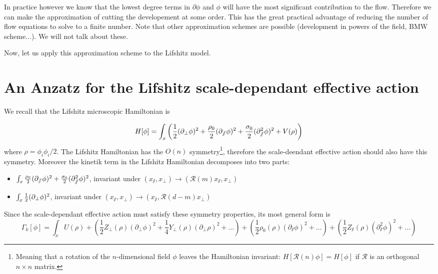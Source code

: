 In practice however we know that the lowest degree terms in $\partial \phi$ and $\phi$ will have the most significant contribution to the flow. Therefore we can make the approximation of cutting the developement at some order. This has the great practical advantage of reducing the number of flow equations to solve to a finite number. Note that other approximation schemes are possible (development in powers of the field, BMW scheme...). We will not talk about these.

Now, let us apply this approximation scheme to the Lifshitz model.

\section{An Anzatz for the Lifshitz scale-dependant effective action}
We recall that the Lifshitz microscopic Hamiltonian is

\begin{equation}
H[\phi] = \int_x \left( \frac{1}{2}(\partial_{\perp} \phi)^2 + \frac{\rho_0}{2}(\partial_{\sslash} \phi)^2 + \frac{\sigma_0}{2} (\partial_{\sslash}^2 \phi)^2 + V(\rho) \right)
\end{equation}
where $\rho = \phi_i \phi_i/2$. 
The Lifshitz Hamiltonian has the $O(n)$ symmetry\footnote{Meaning that a rotation of the $n$-dimensional field $\phi$ leaves the Hamiltonian invariant: $H[\mathcal{R}(n)\phi] = H[\phi]$ if $\mathcal{R}$ is an orthogonal $n \times n$ matrix.}, therefore the scale-deendant effective action should also have this symmetry. Moreover the kinetik term in the Lifshitz Hamiltonian decomposes into two parts:
\begin{itemize}
\item $\int_{x} \frac{\rho_0}{2}(\partial_{\sslash} \phi)^2 + \frac{\sigma_0}{2} (\partial_{\sslash}^2 \phi)^2$, invariant under $\left(x_\sslash,x_\perp \right) \rightarrow \left(\mathcal{R}(m) x_\sslash, x_\perp\right)$
\item $\int_{x} \frac{1}{2}(\partial_{\perp} \phi)^2$, invariant under $\left(x_\sslash,x_\perp \right) \rightarrow \left(x_\sslash, \mathcal{R}(d-m) x_\perp\right)$
\end{itemize}
Since the scale-dependant effective action must satisfy these symmetry properties, its most general form is
\begin{equation}
\Gamma_k[\phi] = \int_{x} U(\rho) + \left( \frac{1}{2} Z_\perp(\rho) (\partial_\perp \phi)^2 + \frac{1}{4} Y_\perp(\rho) (\partial_\perp \rho)^2 + ... \right) + \left( \frac{1}{2} \rho_0(\rho) (\partial_\sslash \phi)^2 + ... \right) + \left( \frac{1}{2} Z_\sslash(\rho) (\partial_\sslash^2 \phi)^2 + ... \right)
\end{equation}

